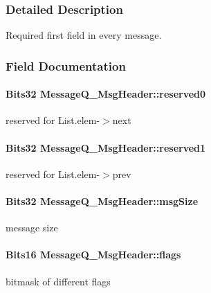 \subsubsection{Detailed Description}
Required first field in every message. 

\subsubsection{Field Documentation}
\paragraph[{reserved0}]{\setlength{\rightskip}{0pt plus 5cm}Bits32 {\bf MessageQ\_\-MsgHeader::reserved0}}\hfill\label{struct_message_q___msg_header_aa8269e435d09e486b167c0b6f9cc90b0}
reserved for List.elem-\/$>$next 
\paragraph[{reserved1}]{\setlength{\rightskip}{0pt plus 5cm}Bits32 {\bf MessageQ\_\-MsgHeader::reserved1}}\hfill\label{struct_message_q___msg_header_a1e12c3020f3f175128bf2ae4c5d1df7c}
reserved for List.elem-\/$>$prev 
\paragraph[{msgSize}]{\setlength{\rightskip}{0pt plus 5cm}Bits32 {\bf MessageQ\_\-MsgHeader::msgSize}}\hfill\label{struct_message_q___msg_header_adee0e6ed997b218584e2009854fa5214}
message size 
\paragraph[{flags}]{\setlength{\rightskip}{0pt plus 5cm}Bits16 {\bf MessageQ\_\-MsgHeader::flags}}\hfill\label{struct_message_q___msg_header_a377485e7c13fde415d7d8811fe8f4f37}
bitmask of different flags 
